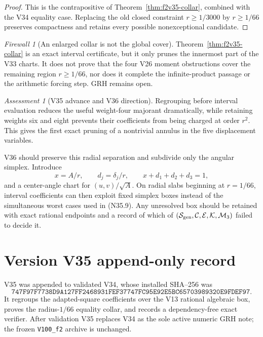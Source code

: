 \documentclass[11pt]{article}
\theoremstyle{definition}
\theoremstyle{remark}
\newtheorem{assessment}[theorem]{Assessment}
\newtheorem{firewall}[theorem]{Firewall}
\begin{document}
\begin{proof}
This is the contrapositive of Theorem~\ref{thm:f2v35-collar}, combined
with the V34 equality case.  Replacing the old closed constraint
\(r\geq1/3000\) by \(r\geq1/66\) preserves compactness and retains every
possible nonexceptional candidate.
\end{proof}

\begin{firewall}[An enlarged collar is not the global cover]
\label{fire:f2v35}
Theorem~\ref{thm:f2v35-collar} is an exact interval certificate, but it
only prunes the innermost part of the V33 charts.  It does not prove that
the four V26 moment obstructions cover the remaining region \(r\geq1/66\),
nor does it complete the infinite-product passage or the arithmetic
forcing step.  GRH remains open.
\end{firewall}

\begin{assessment}[V35 advance and V36 direction]
\label{ass:f2v35}
Regrouping before interval evaluation reduces the useful weight-four
majorant dramatically, while retaining weights six and eight prevents
their coefficients from being charged at order \(r^2\).  This gives the
first exact pruning of a nontrivial annulus in the five displacement
variables.

V36 should preserve this radial separation and subdivide only the angular
simplex.  Introduce
\[
 x=A/r,\qquad d_j=\delta_j/r,
 \qquad x+d_1+d_2+d_3=1,
\tag{N35.20}
\]
and a center-angle chart for \((u,v)/\sqrt A\).  On radial slabs beginning
at \(r=1/66\), interval coefficients can then exploit fixed simplex boxes
instead of the simultaneous worst cases used in \textup{(N35.9)}.  Any
unresolved box should be retained with exact rational endpoints and a
record of which of \((\mathcal S_{\rm gen},\mathcal C,\mathcal E,
\mathcal K,\mathcal M_3)\) failed to decide it.
\end{assessment}

\section*{Version V35 append-only record}

V35 was appended to validated V34, whose installed SHA--256 was
\[
 \texttt{747F97F7738D9A127FF2468931FEF37747FC95E92E5BC65703989320E9FDEF97}.
\tag{N35.21}
\]
It regroups the adapted-square coefficients over the V13 rational
algebraic box, proves the radius-\(1/66\) equality collar, and records a
dependency-free exact verifier.  After validation V35 replaces V34 as the
sole active numeric GRH note; the frozen \texttt{V100\_f2} archive is
unchanged.
\end{document}

